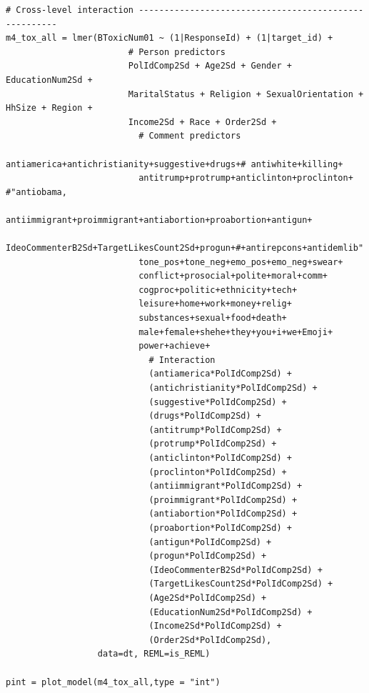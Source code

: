 \documentclass{article}
\begin{document}
\begin{lstlisting}
# Cross-level interaction ------------------------------------------------------
m4_tox_all = lmer(BToxicNum01 ~ (1|ResponseId) + (1|target_id) + 
                        # Person predictors
                        PolIdComp2Sd + Age2Sd + Gender + EducationNum2Sd + 
                        MaritalStatus + Religion + SexualOrientation + HhSize + Region + 
                        Income2Sd + Race + Order2Sd + 
                          # Comment predictors  
                          antiamerica+antichristianity+suggestive+drugs+# antiwhite+killing+
                          antitrump+protrump+anticlinton+proclinton+ #"antiobama,
                          antiimmigrant+proimmigrant+antiabortion+proabortion+antigun+
                          IdeoCommenterB2Sd+TargetLikesCount2Sd+progun+#+antirepcons+antidemlib"
                          tone_pos+tone_neg+emo_pos+emo_neg+swear+
                          conflict+prosocial+polite+moral+comm+
                          cogproc+politic+ethnicity+tech+
                          leisure+home+work+money+relig+  
                          substances+sexual+food+death+    
                          male+female+shehe+they+you+i+we+Emoji+
                          power+achieve+
                            # Interaction
                            (antiamerica*PolIdComp2Sd) +
                            (antichristianity*PolIdComp2Sd) +
                            (suggestive*PolIdComp2Sd) +
                            (drugs*PolIdComp2Sd) +
                            (antitrump*PolIdComp2Sd) +
                            (protrump*PolIdComp2Sd) +
                            (anticlinton*PolIdComp2Sd) +
                            (proclinton*PolIdComp2Sd) +
                            (antiimmigrant*PolIdComp2Sd) +
                            (proimmigrant*PolIdComp2Sd) +
                            (antiabortion*PolIdComp2Sd) +
                            (proabortion*PolIdComp2Sd) +
                            (antigun*PolIdComp2Sd) +
                            (progun*PolIdComp2Sd) +
                            (IdeoCommenterB2Sd*PolIdComp2Sd) +
                            (TargetLikesCount2Sd*PolIdComp2Sd) +
                            (Age2Sd*PolIdComp2Sd) +
                            (EducationNum2Sd*PolIdComp2Sd) +
                            (Income2Sd*PolIdComp2Sd) +
                            (Order2Sd*PolIdComp2Sd),
                  data=dt, REML=is_REML)

pint = plot_model(m4_tox_all,type = "int")




\end{lstlisting}
\end{document}
